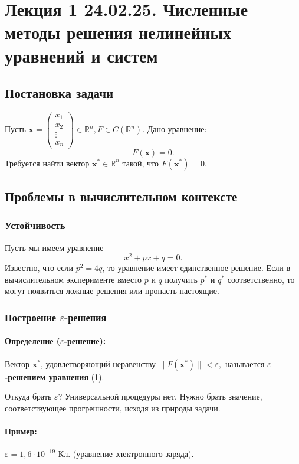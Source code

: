 \section{Лекция 1 24.02.25. Численные методы решения нелинейных уравнений и систем}
\subsection{Постановка задачи}
Пусть $\mathbf{x} = \begin{pmatrix} 
x_1    \\ 
x_2    \\ 
\vdots \\ 
x_n    
\end{pmatrix} \in \mathbb{R}^n, F \in C(\mathbb{R}^n).
$
Дано уравнение:
\begin{equation}
F(\mathbf{x}) = 0. 
\end{equation}
Требуется найти вектор $\mathbf{x^*} \in \mathbb{R}^n$ такой, что $F(\mathbf{x^*}) = 0$.
\subsection{Проблемы в вычислительном контексте}
\subsubsection{Устойчивость}
Пусть мы имеем уравнение
\[
x^2 + px + q = 0.
\]
Известно, что если $p^2 = 4q$,
то уравнение имеет единственное решение.
Если в вычислительном эксперименте вместо $p$ и $q$ получить $p^*$ и $q^*$ соответственно, то могут появиться ложные решения или пропасть настоящие.
\subsubsection{Построение $\varepsilon$-решения}
\paragraph{Определение ($\varepsilon$-решение):} Вектор $\mathbf{x^*}$, удовлетворяющий неравенству
$
\|F(\mathbf{x^*})\| < \varepsilon,
$
называется \textbf{$\varepsilon$-решением уравнения} (1).

Откуда брать $\varepsilon$? Универсальной процедуры нет. Нужно брать значение, соответствующее прогрешности, исходя из природы задачи.
\paragraph{Пример:} 
$\varepsilon = 1,6 \cdot 10^{-19}$ Кл. (уравнение электронного заряда).
